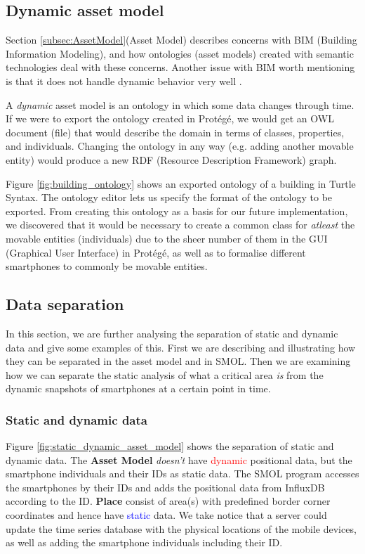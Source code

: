 \documentclass{article}
\begin{document}
\subsection{Dynamic asset model}\label{subsubsec:DynamicAssetModel}
Section \ref{subsec:AssetModel}(Asset Model) describes concerns with BIM (Building Information Modeling), and how ontologies (asset models) created with semantic technologies deal with these concerns. Another issue with BIM worth mentioning is that it does not handle dynamic behavior very well \cite{kamburjan_digital_2022}.

A \emph{dynamic} asset model is an ontology in which some data changes through time. If we were to export the ontology created in Protégé, we would get an OWL document (file) that would describe the domain in terms of classes, properties, and individuals. Changing the ontology in any way (e.g. adding another movable entity) would produce a new RDF (Resource Description Framework) graph.

Figure \ref{fig:building_ontology} shows an exported ontology of a building in Turtle Syntax. The ontology editor lets us specify the format of the ontology to be exported. From creating this ontology as a basis for our future implementation, we discovered that it would be necessary to create a common class for \emph{atleast} the movable entities (individuals) due to the sheer number of them in the GUI (Graphical User Interface) in Protégé, as well as to formalise different smartphones to commonly be movable entities.

\subsection{Data separation}
In this section, we are further analysing the separation of static and dynamic data and give some examples of this. First we are describing and illustrating how they can be separated in the asset model and in SMOL. Then we are examining how we can separate the static analysis of what a critical area \emph{is} from the dynamic snapshots of smartphones at a certain point in time.

\subsubsection{Static and dynamic data}
Figure \ref{fig:static_dynamic_asset_model} shows the separation of static and dynamic data. The \textbf{Asset Model} \emph{doesn't} have \textcolor{red}{dynamic} positional data, but the smartphone individuals and their IDs as static data. The SMOL program accesses the smartphones by their IDs and adds the positional data from InfluxDB according to the ID. \textbf{Place} consist of area(s) with predefined border corner coordinates and hence have \textcolor{blue}{static} data. We take notice that a server could update the time series database with the physical locations of the mobile devices, as well as adding the smartphone individuals including their ID.
\end{document}
